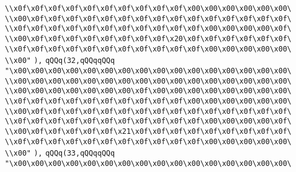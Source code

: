 \verb|\\x0f\x0f\x0f\x0f\x0f\x0f\x0f\x0f\x0f\x0f\x00\x00\x00\x00\x00\x00\|\newline
\verb|\\x00\x0f\x0f\x0f\x0f\x0f\x0f\x0f\x0f\x0f\x0f\x0f\x0f\x0f\x0f\x0f\|\newline
\verb|\\x0f\x0f\x0f\x0f\x0f\x0f\x0f\x0f\x0f\x0f\x0f\x00\x00\x00\x00\x0f\|\newline
\verb|\\x00\x0f\x0f\x0f\x0f\x0f\x0f\x0f\x0f\x20\x0f\x0f\x0f\x0f\x0f\x0f\|\newline
\verb|\\x0f\x0f\x0f\x0f\x0f\x0f\x0f\x0f\x0f\x0f\x0f\x00\x00\x00\x00\x00\|\newline
\verb|\\x00"|\newline
\verb|),|\newline
\verb|qQQq(32,qQQqqQQq|\newline
\verb|"\x00\x00\x00\x00\x00\x00\x00\x00\x00\x00\x00\x00\x00\x00\x00\x00\|\newline
\verb|\\x00\x00\x00\x00\x00\x00\x00\x00\x00\x00\x00\x00\x00\x00\x00\x00\|\newline
\verb|\\x00\x00\x00\x00\x00\x00\x00\x0f\x00\x00\x00\x00\x00\x00\x00\x00\|\newline
\verb|\\x0f\x0f\x0f\x0f\x0f\x0f\x0f\x0f\x0f\x0f\x00\x00\x00\x00\x00\x00\|\newline
\verb|\\x00\x0f\x0f\x0f\x0f\x0f\x0f\x0f\x0f\x0f\x0f\x0f\x0f\x0f\x0f\x0f\|\newline
\verb|\\x0f\x0f\x0f\x0f\x0f\x0f\x0f\x0f\x0f\x0f\x0f\x00\x00\x00\x00\x0f\|\newline
\verb|\\x00\x0f\x0f\x0f\x0f\x0f\x21\x0f\x0f\x0f\x0f\x0f\x0f\x0f\x0f\x0f\|\newline
\verb|\\x0f\x0f\x0f\x0f\x0f\x0f\x0f\x0f\x0f\x0f\x0f\x00\x00\x00\x00\x00\|\newline
\verb|\\x00"|\newline
\verb|),|\newline
\verb|qQQq(33,qQQqqQQq|\newline
\verb|"\x00\x00\x00\x00\x00\x00\x00\x00\x00\x00\x00\x00\x00\x00\x00\x00\|\newline
